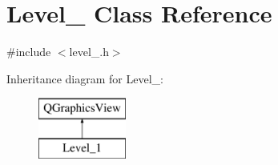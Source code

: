 \hypertarget{class_level__1}{}\section{Level\+\_ Class Reference}
\label{class_level__1}


{\ttfamily \#include $<$level\+\_.\+h$>$}

Inheritance diagram for Level\+\_\+:\begin{figure}[H]
\begin{center}
\leavevmode
\includegraphics[height=2.000000cm]{class_level__1}
\end{center}
\end{figure}
